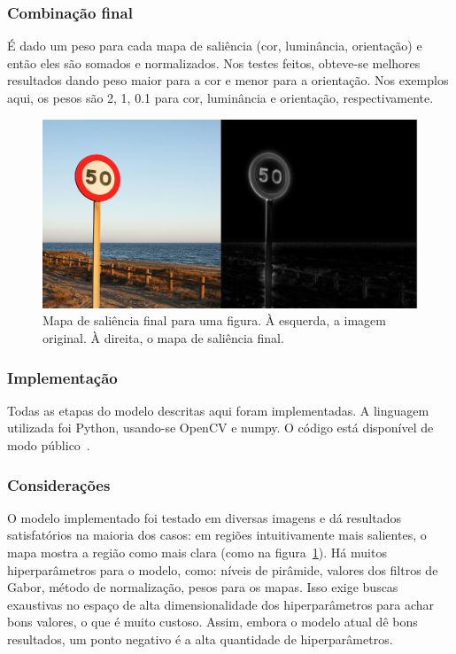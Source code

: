 \documentclass[article]{IEEEtran}
\begin{document}
\subsubsection{Combinação final}
É dado um peso para cada mapa de saliência (cor, luminância, orientação)
e então eles são somados e normalizados. Nos testes feitos, obteve-se
melhores resultados dando peso maior para a cor e menor para a orientação.
Nos exemplos aqui, os pesos são 2, 1, 0.1 para cor, luminância e orientação,
respectivamente.
\begin{figure}[H]
\begin{center}
        \includegraphics[width=0.6\linewidth]{img/att.png}
\end{center}
\caption{Mapa de saliência final para uma figura. À esquerda, a imagem
    original. À direita, o mapa de saliência final.}
\label{fig:att}
\end{figure}

\subsubsection{Implementação}
Todas as etapas do modelo descritas aqui foram implementadas.
A linguagem utilizada foi Python, usando-se OpenCV e numpy.
O código está disponível de modo público~\cite{att}.

\subsubsection{Considerações}
O modelo implementado foi testado em diversas imagens e dá resultados
satisfatórios na maioria dos casos: em regiões intuitivamente mais salientes,
o mapa mostra a região como mais clara (como na figura~\ref{fig:att}).
Há muitos hiperparâmetros para o modelo, como: níveis de pirâmide,
valores dos filtros de Gabor, método de normalização, pesos para os mapas.
Isso exige buscas exaustivas no espaço de alta dimensionalidade dos
hiperparâmetros para achar bons valores, o que é muito custoso.
Assim, embora o modelo atual dê bons resultados, um ponto negativo
é a alta quantidade de hiperparâmetros.
\end{document}
